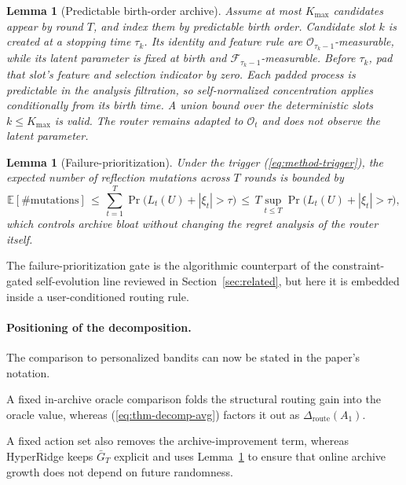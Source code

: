 \documentclass{article} %
\newtheorem{lemma}[theorem]{Lemma}
\providecommand{\E}{\mathbb{E}}
\renewcommand{\eqref}[1]{\textup{(\ref{#1})}}
\begin{document}
\begin{lemma}[Predictable birth-order archive]
\label{lem:predictable}
Assume at most $K_{\max}$ candidates appear by round $T$, and index them by predictable birth order. Candidate slot $k$ is created at a stopping time $\tau_k$. Its identity and feature rule are $\mathcal O_{\tau_k-1}$-measurable, while its latent parameter is fixed at birth and $\mathcal F_{\tau_k-1}$-measurable. Before $\tau_k$, pad that slot's feature and selection indicator by zero. Each padded process is predictable in the analysis filtration, so self-normalized concentration applies conditionally from its birth time. A union bound over the deterministic slots $k\le K_{\max}$ is valid. The router remains adapted to \(\mathcal O_t\) and does not observe the latent parameter.
\end{lemma}

\begin{lemma}[Failure-prioritization]
\label{lem:failure}
Under the trigger \eqref{eq:method-trigger}, the expected number of reflection mutations across $T$ rounds is bounded by
\begin{equation}
\label{eq:lem-failure}
\E[\#\mathrm{mutations}]
\,\le\,
\sum_{t=1}^{T}\Pr\bigl(L_t(U)+|\xi_t|>\tau\bigr)
\,\le\,
T\sup_{t\le T}\Pr\bigl(L_t(U)+|\xi_t|>\tau\bigr),
\end{equation}
which controls archive bloat without changing the regret analysis of the router itself.
\end{lemma}

The failure-prioritization gate is the algorithmic counterpart of the constraint-gated self-evolution line reviewed in Section~\ref{sec:related}, but here it is embedded inside a user-conditioned routing rule.

\paragraph{Positioning of the decomposition.}
The comparison to personalized bandits can now be stated in the paper's notation.

A fixed in-archive oracle comparison folds the structural routing gain into the oracle value, whereas \eqref{eq:thm-decomp-avg} factors it out as $\Delta_{\mathrm{route}}(A_1)$.

A fixed action set also removes the archive-improvement term, whereas HyperRidge keeps $\bar G_T$ explicit and uses Lemma~\ref{lem:predictable} to ensure that online archive growth does not depend on future randomness.
\end{document}

